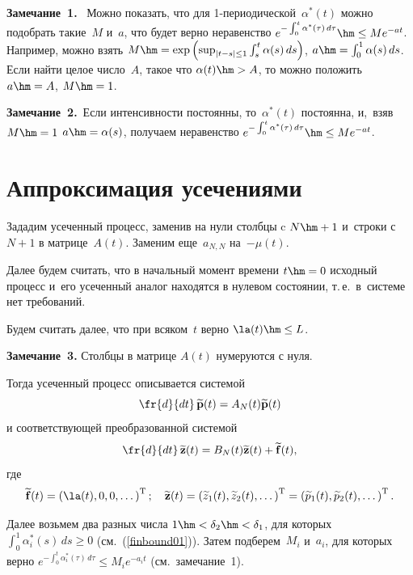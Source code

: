 \noindent
\textbf{Замечание~1.}\
Можно показать, что для 1-пе\-рио\-ди\-че\-ской~$\alpha^*(t)$ можно подобрать такие~$M$ и~$a$, что
будет верно неравенство $e^{-\int\nolimits_0^t\alpha^*(\tau)\, d\tau}\hm\le M e^{-at}$.
Например, можно взять $M\hm=\exp\left(\sup\nolimits_{|t-s|\le 1} \int\nolimits_s^t\alpha(s)\,ds\right)$, 
$a\hm=\int\nolimits_0^1 \alpha(s)\, ds$.
Если найти целое число~$A$, такое что $\alpha(t)\hm>A$, то можно положить
$a\hm=A$, $M\hm=1$.


\smallskip

\noindent
\textbf{Замечание~2.}\
    Если интенсивности постоянны, то~$\alpha^*(t)$ постоянна, и,~взяв   $M\hm=1$
    $a\hm=\alpha(s)$, получаем  неравенство $e^{-\int\nolimits_0^t\alpha^*(\tau)\, d\tau}\hm\le M e^{-at}$.



\section{Аппроксимация усечениями}

Зададим усеченный процесс, заменив на нули столбцы c $N\hm+1$ и~строки с~$N+1$ в матрице~$A(t)$. 
Заменим еще~$a_{N,N}$ на~$-\mu(t)$.

Далее будем считать, что в начальный момент времени $t\hm=0$ исходный процесс 
и~его усеченный аналог находятся в нулевом состоянии, т.\,е.\ в~системе нет требований.

Будем считать далее, что при всяком~$t$ верно $\la(t)\hm\le L$.

\smallskip

\noindent
\textbf{Замечание~3.}
Столбцы в матрице $A(t)$ нумеруются с нуля.

\smallskip

Тогда усеченный процесс описывается системой
\begin{equation*}
\fr{d}{dt}\,\vwp(t)=A_N(t)\vwp(t)
\end{equation*}
и соответствующей преобразованной системой
\begin{equation}
\fr{d}{dt}\,\vwz(t)= B_N(t)\vwz(t)+\vwf(t), 
\label{2.06susech}
\end{equation}
где
$$
\vwf(t)=\left( \la(t),  0, 0, \dots \right)^{\mathrm{T}}; \quad
\vwz(t)=\left(\wwz_1(t), \wwz_2(t),\dots \right)^{\mathrm{T}}=
\left(\wwp_1(t), \wwp_2(t),\dots \right)^{\mathrm{T}}.
$$

Далее возьмем два разных числа $1 \hm< \delta_2 \hm< \delta_1$, для которых 
$\int\nolimits_0^1\alpha^*_i(s)\,ds\ge 0$ (см.~(\ref{finbound01})). 
Затем  подберем~$M_i$ и~$a_i$, для которых верно  
$e^{-\int\nolimits_0^t\alpha_i^*(\tau)\, d\tau}\le M_i e^{-a_it}$ (см.\ замечание~1).

